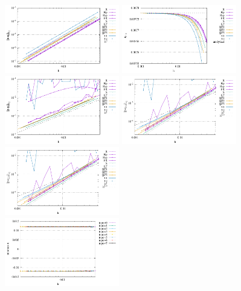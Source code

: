 \begin{center}
\includegraphics[width=5cm]{python_codes/fieldstone_78/results/errors_u_exp1.pdf}
\includegraphics[width=5cm]{python_codes/fieldstone_78/results/vrms_exp1.pdf} \\
\includegraphics[width=5cm]{python_codes/fieldstone_78/results/errors_p_exp1.pdf}
\includegraphics[width=5cm]{python_codes/fieldstone_78/results/errors_q1_exp1.pdf}
\includegraphics[width=5cm]{python_codes/fieldstone_78/results/errors_q2_exp1.pdf}\\
\includegraphics[width=5cm]{python_codes/fieldstone_78/results/stats_u_exp1.pdf}

\end{center}
